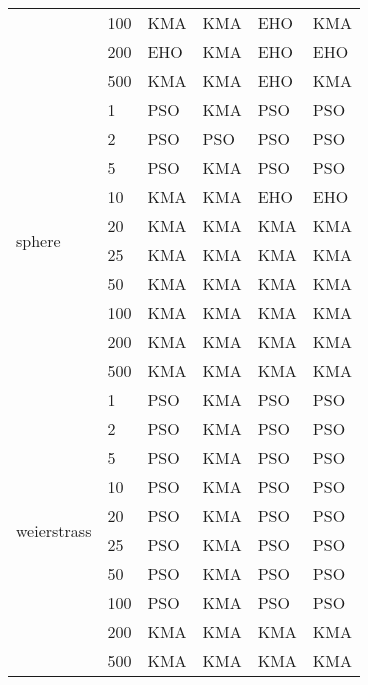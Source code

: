 \begin{longtable}[c]{|p{3.5cm}|l|l|l|l|l|}
                                       & 100       & KMA & KMA  & EHO   & KMA \\ \cline{2-6} 
                                       & 200       & EHO & KMA  & EHO   & EHO \\ \cline{2-6} 
                                       & 500       & KMA & KMA  & EHO   & KMA \\ \hline
\multirow[t]{10}{*}{sphere}               & 1         & PSO & KMA  & PSO   & PSO \\ \cline{2-6} 
                                       & 2         & PSO & PSO  & PSO   & PSO \\ \cline{2-6} 
                                       & 5         & PSO & KMA  & PSO   & PSO \\ \cline{2-6} 
                                       & 10        & KMA & KMA  & EHO   & EHO \\ \cline{2-6} 
                                       & 20        & KMA & KMA  & KMA   & KMA \\ \cline{2-6} 
                                       & 25        & KMA & KMA  & KMA   & KMA \\ \cline{2-6} 
                                       & 50        & KMA & KMA  & KMA   & KMA \\ \cline{2-6} 
                                       & 100       & KMA & KMA  & KMA   & KMA \\ \cline{2-6} 
                                       & 200       & KMA & KMA  & KMA   & KMA \\ \cline{2-6} 
                                       & 500       & KMA & KMA  & KMA   & KMA \\ \hline
\multirow[t]{10}{*}{weierstrass}          & 1         & PSO & KMA  & PSO   & PSO \\ \cline{2-6} 
                                       & 2         & PSO & KMA  & PSO   & PSO \\ \cline{2-6} 
                                       & 5         & PSO & KMA  & PSO   & PSO \\ \cline{2-6} 
                                       & 10        & PSO & KMA  & PSO   & PSO \\ \cline{2-6} 
                                       & 20        & PSO & KMA  & PSO   & PSO \\ \cline{2-6} 
                                       & 25        & PSO & KMA  & PSO   & PSO \\ \cline{2-6} 
                                       & 50        & PSO & KMA  & PSO   & PSO \\ \cline{2-6} 
                                       & 100       & PSO & KMA  & PSO   & PSO \\ \cline{2-6} 
                                       & 200       & KMA & KMA  & KMA   & KMA \\ \cline{2-6} 
                                       & 500       & KMA & KMA  & KMA   & KMA \\ \hline
\end{longtable}

